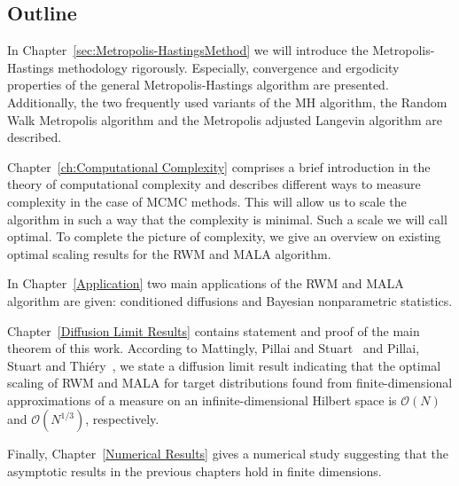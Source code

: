 \subsection*{Outline}

In Chapter~\ref{sec:Metropolis-HastingsMethod} we will introduce the Metropolis-Hastings methodology rigorously. Especially, convergence and ergodicity properties of the general Metropolis-Hastings algorithm are presented. Additionally, the two frequently used variants of the MH algorithm, the Random Walk Metropolis algorithm and the Metropolis adjusted Langevin algorithm are described.

Chapter~\ref{ch:Computational Complexity} comprises a brief introduction in the theory of computational complexity and describes different ways to measure complexity in the case of MCMC methods. This will  allow us to scale the algorithm in such a way that the complexity is minimal. Such a scale we will call optimal. To complete the picture of complexity, we give an overview on existing optimal scaling results for the RWM and MALA algorithm. 

In Chapter~\ref{Application} two main applications of the RWM and MALA algorithm are given: conditioned diffusions and Bayesian nonparametric statistics. 

Chapter~\ref{Diffusion Limit Results} contains statement and proof of the main theorem of this work. According to Mattingly, Pillai and Stuart~\autocite{Mattingly2010} and Pillai, Stuart and Thi\'{e}ry~\autocite{Pillai2012}, we state a diffusion limit result indicating that the optimal scaling of RWM and MALA  for target distributions found from finite-dimensional approximations of a measure on an infinite-dimensional Hilbert space is $\mathcal{O}(N)$ and $\mathcal{O}(N^{1/3})$, respectively. 

Finally, Chapter~\ref{Numerical Results} gives a numerical study suggesting that the asymptotic results in the previous chapters hold in finite dimensions.






